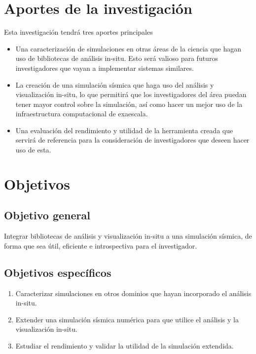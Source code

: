 \section{Aportes de la investigación}
Esta investigación tendrá tres aportes principales
\begin{itemize}
  \item Una caracterización de simulaciones en otras áreas de la ciencia que hagan uso de bibliotecas de análisis in-situ. Esto será valioso para futuros investigadores que vayan a implementar sistemas similares. 
  \item La creación de una simulación sísmica que haga uso del análisis y visualización in-situ, lo que permitirá que los investigadores del área puedan tener mayor control sobre la simulación, así como hacer un mejor uso de la infraestructura computacional de exaescala. 
  \item Una evaluación del rendimiento y utilidad de la herramienta creada que servirá de referencia para la consideración de investigadores que deseen hacer uso de esta. 
  
\end{itemize}

\section{Objetivos}
\subsection{Objetivo general}
Integrar bibliotecas de análisis y visualización in-situ a una simulación sísmica, de forma que sea útil, eficiente e introspectiva para el investigador.
\subsection{Objetivos específicos}
\begin{enumerate}
  \item Caracterizar simulaciones en otros dominios que hayan incorporado el análisis in-situ. %
  \item Extender una simulación sísmica numérica para que utilice el análisis y la visualización in-situ. %
  \item Estudiar el rendimiento y validar la utilidad de la simulación extendida. %
\end{enumerate}
